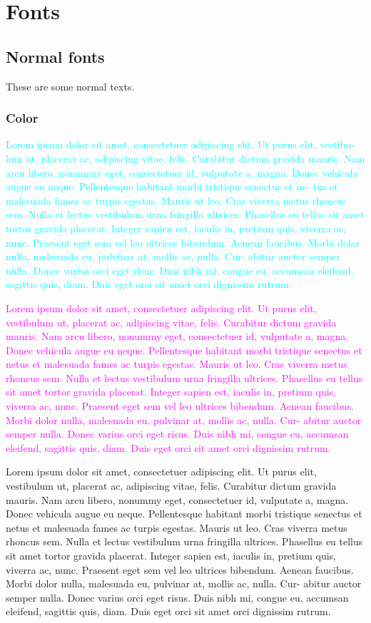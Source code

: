 \documentclass{article}
\begin{document}
\section{Fonts}
\subsection{Normal fonts}
These are some normal texts.
\subsubsection{Color}
\textcolor{cyan}{Lorem ipsum dolor sit amet, consectetuer adipiscing elit. Ut purus elit, vestibu- lum ut, placerat ac, adipiscing vitae, felis. Curabitur dictum gravida mauris. Nam arcu libero, nonummy eget, consectetuer id, vulputate a, magna. Donec vehicula augue eu neque. Pellentesque habitant morbi tristique senectus et ne- tus et malesuada fames ac turpis egestas. Mauris ut leo. Cras viverra metus rhoncus sem. Nulla et lectus vestibulum urna fringilla ultrices. Phasellus eu tellus sit amet tortor gravida placerat. Integer sapien est, iaculis in, pretium quis, viverra ac, nunc. Praesent eget sem vel leo ultrices bibendum. Aenean faucibus. Morbi dolor nulla, malesuada eu, pulvinar at, mollis ac, nulla. Cur- abitur auctor semper nulla. Donec varius orci eget risus. Duis nibh mi, congue eu, accumsan eleifend, sagittis quis, diam. Duis eget orci sit amet orci dignissim rutrum.}
\par 
\textcolor{magenta}{Lorem ipsum dolor sit amet, consectetuer adipiscing elit. Ut purus elit, vestibulum ut, placerat ac, adipiscing vitae, felis. Curabitur dictum gravida mauris. Nam arcu libero, nonummy eget, consectetuer id, vulputate a, magna. Donec vehicula augue eu neque. Pellentesque habitant morbi tristique senectus et netus et malesuada fames ac turpis egestas. Mauris ut leo. Cras viverra metus rhoncus sem. Nulla et lectus vestibulum urna fringilla ultrices. Phasellus eu tellus sit amet tortor gravida placerat. Integer sapien est, iaculis in, pretium quis, viverra ac, nunc. Praesent eget sem vel leo ultrices bibendum. Aenean faucibus. Morbi dolor nulla, malesuada eu, pulvinar at, mollis ac, nulla. Cur- abitur auctor semper nulla. Donec varius orci eget risus. Duis nibh mi, congue eu, accumsan eleifend, sagittis quis, diam. Duis eget orci sit amet orci dignissim rutrum.}
\par 
Lorem ipsum dolor sit amet, consectetuer adipiscing elit. Ut purus elit, vestibulum ut, placerat ac, adipiscing vitae, felis. Curabitur dictum gravida mauris. Nam arcu libero, nonummy eget, consectetuer id, vulputate a, magna. Donec vehicula augue eu neque. Pellentesque habitant morbi tristique senectus et netus et malesuada fames ac turpis egestas. Mauris ut leo. Cras viverra metus rhoncus sem. Nulla et lectus vestibulum urna fringilla ultrices. Phasellus eu tellus sit amet tortor gravida placerat. Integer sapien est, iaculis in, pretium quis, viverra ac, nunc. Praesent eget sem vel leo ultrices bibendum. Aenean faucibus. Morbi dolor nulla, malesuada eu, pulvinar at, mollis ac, nulla. Cur- abitur auctor semper nulla. Donec varius orci eget risus. Duis nibh mi, congue eu, accumsan eleifend, sagittis quis, diam. Duis eget orci sit amet orci dignissim rutrum.
\end{document}

